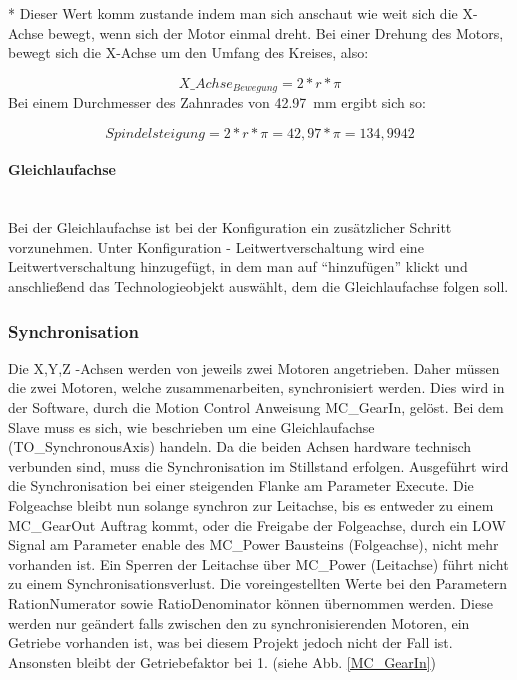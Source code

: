 * Dieser Wert komm zustande indem man sich anschaut wie weit sich die X-Achse bewegt, wenn sich der Motor einmal dreht. Bei einer Drehung des Motors, bewegt sich die X-Achse um den Umfang des Kreises, also:

\vspace{-6mm}
        \begin{equation*}
          X\_Achse_{Bewegung} = 2 * r * \pi
        \end{equation*}
Bei einem Durchmesser des Zahnrades von \qty{42,97}{\milli\meter} ergibt sich so:

\vspace{-6mm}
        \begin{equation*}
            Spindelsteigung = 2 * r * \pi = 42,97 * \pi = 134,9942
        \end{equation*}

\paragraph{Gleichlaufachse} \mbox{} \\
Bei der Gleichlaufachse ist bei der Konfiguration ein zusätzlicher Schritt vorzunehmen. Unter Konfiguration - Leitwertverschaltung wird eine Leitwertverschaltung hinzugefügt, in dem man auf \enquote{hinzufügen} klickt und anschließend das Technologieobjekt auswählt, dem die Gleichlaufachse folgen soll.



\subsubsection{Synchronisation}
Die X,Y,Z -Achsen werden von jeweils zwei Motoren angetrieben. Daher müssen die zwei Motoren, welche zusammenarbeiten, synchronisiert werden. Dies wird in der Software, durch die Motion Control Anweisung MC\_GearIn, gelöst. Bei dem Slave muss es sich, wie beschrieben um eine Gleichlaufachse (TO\_SynchronousAxis) handeln. Da die beiden Achsen hardware technisch verbunden sind, muss die Synchronisation im Stillstand erfolgen. Ausgeführt wird die Synchronisation bei einer steigenden Flanke am Parameter Execute. Die Folgeachse bleibt nun solange synchron zur Leitachse, bis es entweder zu einem MC\_GearOut Auftrag kommt, oder die Freigabe der Folgeachse, durch ein LOW Signal am Parameter enable des MC\_Power Bausteins (Folgeachse), nicht mehr vorhanden ist. Ein Sperren der Leitachse über MC\_Power (Leitachse) führt nicht zu einem Synchronisationsverlust. Die voreingestellten Werte bei den Parametern RationNumerator sowie RatioDenominator können übernommen werden. Diese werden nur geändert falls zwischen den zu synchronisierenden Motoren, ein Getriebe vorhanden ist, was bei diesem Projekt jedoch nicht der Fall ist. Ansonsten bleibt der Getriebefaktor bei 1. (siehe Abb. \ref{MC_GearIn})


